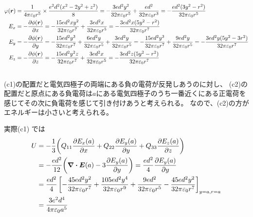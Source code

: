 \documentclass[../../sp_2022.tex]{subfiles}
\begin{document}
\subsection{}
\begin{equation}\begin{aligned}[b]
    \varphi(\vb*{r}) &= \frac{1}{4\pi\varepsilon_0r^5}\times \frac{e^2d^2(x^2-2y^2+z^2)}{8}
    =-\frac{3ed^2y^2}{32\pi\varepsilon_0r^5}+\frac{ed^2}{32\pi\varepsilon_0 r^3}
    = -\frac{ed^2(3y^2-r^2)}{32\pi\varepsilon_0r^5}\\
    E_x &= -\pdv{\phi(\vb*{r})}{x}
        = -\frac{15ed^2xy^2}{32\pi\varepsilon_0r^7}+\frac{3ed^2x}{32\pi\varepsilon_0 r^5}
        =-\frac{3ed^2x(5y^2-r^2)}{32\pi\varepsilon_0r^7}\\
    E_y &= -\pdv{\phi(\vb*{r})}{y}
        = -\frac{15ed^2y^3}{32\pi\varepsilon_0r^7}+\frac{6ed^2y}{32\pi\varepsilon_0r^5}
        +\frac{3ed^2y}{32\pi\varepsilon_0 r^5}
        = -\frac{15ed^2y^3}{32\pi\varepsilon_0r^7}+\frac{9ed^2y}{32\pi\varepsilon_0r^5}
        = -\frac{3ed^2y(5y^2-3r^2)}{32\pi\varepsilon_0r^7}\\
    E_z &= -\pdv{\phi(\vb*{r})}{z}
        = -\frac{15ed^2y^2z}{32\pi\varepsilon_0r^7}+\frac{3ed^2x}{32\pi\varepsilon_0 r^5}
        =-\frac{3ed^2z(5y^2-r^2)}{32\pi\varepsilon_0r^7}\\
\end{aligned}\end{equation}

\subsection{}
(c1)の配置だと電気四極子の両端にある負の電荷が反発しあうのに対し、
(c2)の配置だと原点にある負電荷は\(a\)にある電気四極子のうち一番近くにある正電荷を感じてその次に負電荷を感じて引き付けあうと考えられる。
なので、(c2)の方がエネルギーは小さいと考えられる。

実際(c1)
では
\begin{equation}\begin{aligned}[b]
    U &= -\frac{1}{3} \qty(Q_{11}\pdv{E_x(a)}{x}+Q_{22}\pdv{E_y(a)}{y}+Q_{33}\pdv{E_z(a)}{z})\\
    &= -\frac{ed^2}{12} \qty( \div \vb*{E}(a)-3\pdv{E_y(a)}{y})
    = \frac{ed^2}{4} \pdv{E_y(a)}{y}\\
    &= \frac{ed^2}{4} \left[-\frac{45ed^2y^2}{32\pi\varepsilon_0r^7}+\frac{105ed^2y^4}{32\pi\varepsilon_0r^9}
    +\frac{9ed^2}{32\pi\varepsilon_0r^5}-\frac{45ed^2y^2}{32\pi\varepsilon_0r^7}\right]_{y=a,r=a}\\
    &= \frac{3e^2d^4}{4\pi\varepsilon_0a^5}
\end{aligned}\end{equation}
\end{document}
